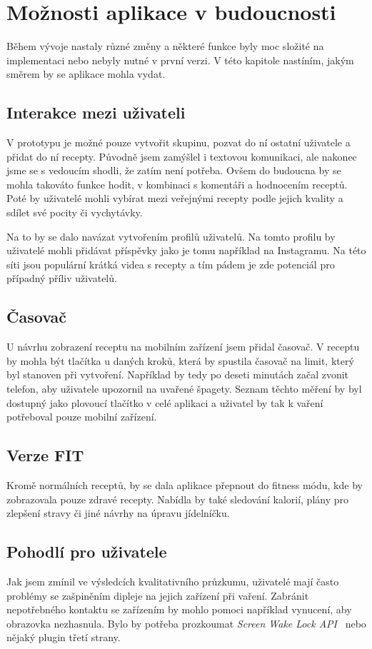 
\chapter{Možnosti aplikace v budoucnosti}

Během vývoje nastaly různé změny a některé funkce byly moc složité na implementaci nebo nebyly nutné v první verzi.
V této kapitole nastíním, jakým směrem by se aplikace mohla vydat.

\section{Interakce mezi uživateli}
V prototypu je možné pouze vytvořit skupinu, pozvat do ní ostatní uživatele a přidat do ní recepty. Původně jsem zamýšlel
i textovou komunikaci, ale nakonec jsme se s vedoucím shodli, že zatím není potřeba. Ovšem do budoucna by se mohla takováto
funkce hodit, v kombinaci s komentáři a hodnocením receptů. Poté by uživatelé mohli vybírat mezi veřejnými recepty podle
jejich kvality a sdílet své pocity či vychytávky.

Na to by se dalo navázat vytvořením profilů uživatelů. Na tomto profilu by uživatelé mohli přidávat příspěvky jako je tomu
například na Instagramu. Na této síti jsou populární krátká videa s recepty a tím pádem je zde potenciál pro případný %
příliv uživatelů.

\section{Časovač}
U návrhu zobrazení receptu na mobilním zařízení jsem přidal časovač. V receptu by mohla být tlačítka u daných kroků, která
by spustila časovač na limit, který byl stanoven při vytvoření. Například by tedy po deseti minutách začal zvonit telefon, aby
uživatele upozornil na uvařené špagety. Seznam těchto měření by byl dostupný jako plovoucí tlačítko
v celé aplikaci a uživatel by tak k vaření potřeboval pouze mobilní zařízení.

\section{Verze FIT}
Kromě normálních receptů, by se dala aplikace přepnout do fitness módu, kde by zobrazovala pouze zdravé recepty. Nabídla by
také sledování kalorií, plány pro zlepšení stravy či jiné návrhy na úpravu jídelníčku.

\section{Pohodlí pro uživatele}
Jak jsem zmínil ve výsledcích kvalitativního průzkumu, uživatelé mají často problémy se zašpiněním dipleje na jejich zařízení při vaření.
Zabránit nepotřebného kontaktu se zařízením by mohlo pomoci například vynucení, aby obrazovka nezhasnula. Bylo by potřeba prozkoumat
\emph{Screen Wake Lock API}~\cite{ScreenWakeLockAPI} nebo nějaký plugin třetí strany.

